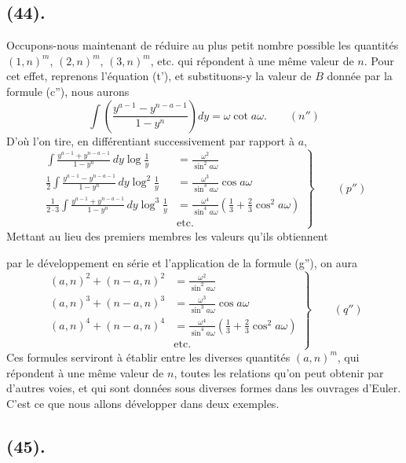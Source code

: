 \documentclass{article}
\begin{document}
\subsection*{(44).}

Occupons-nous maintenant de réduire au plus petit nombre possible les quantités $(1,n)^{m}$, $(2,n)^{m}$, $(3,n)^{m}$, etc. qui répondent à une même valeur de $n$. Pour cet effet, reprenons l'équation (t'), et substituons-y la valeur de $B$ donnée par la formule (c''), nous aurons
\[ \int\left(\frac{y^{a-1}-y^{n-a-1}}{1-y^{n}}\right)dy=\omega\cot a\omega.\qquad(n'') \]
D'où l'on tire, en différentiant successivement par rapport à $a$,
\[ \left.\begin{aligned} \int\frac{y^{a-1}+y^{n-a-1}}{1-y^{n}}\,dy\log\frac{1}{y}&=\frac{\omega^{2}}{\sin^{2}a\omega}\\ \frac{1}{2}\int\frac{y^{a-1}-y^{n-a-1}}{1-y^{n}}\,dy\log^{2}\frac{1}{y}&=\frac{\omega^{3}}{\sin^{3}a\omega}\cos a\omega\\ \frac{1}{2\cdot 3}\int\frac{y^{a-1}+y^{n-a-1}}{1-y^{n}}\,dy\log^{3}\frac{1}{y}&=\frac{\omega^{4}}{\sin^{4}a\omega}\left(\frac{1}{3}+\frac{2}{3}\cos^{2}a\omega\right)\\ &\text{etc.} \end{aligned}\right\}\qquad(p'') \]
Mettant au lieu des premiers membres les valeurs qu'ils obtiennent

par le développement en série et l'application de la formule (g''), on aura
\[ \left.\begin{aligned} (a,n)^{2}+(n-a,n)^{2}&=\frac{\omega^{2}}{\sin^{2}a\omega}\\ (a,n)^{3}+(n-a,n)^{3}&=\frac{\omega^{3}}{\sin^{3}a\omega}\cos a\omega\\ (a,n)^{4}+(n-a,n)^{4}&=\frac{\omega^{4}}{\sin^{4}a\omega}\left(\frac{1}{3}+\frac{2}{3}\cos^{2}a\omega\right)\\ &\text{etc.} \end{aligned}\right\}\qquad(q'') \]
Ces formules serviront à établir entre les diverses quantités $(a,n)^{m}$, qui répondent à une même valeur de $n$, toutes les relations qu'on peut obtenir par d'autres voies, et qui sont données sous diverses formes dans les ouvrages d'Euler. C'est ce que nous allons développer dans deux exemples.

\subsection*{(45).}
\end{document}
